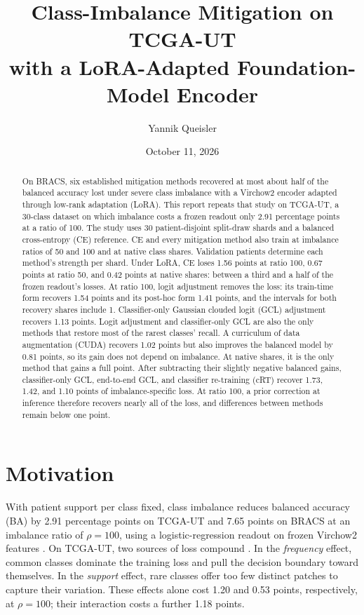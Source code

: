 \documentclass[11pt]{article}
\title{Class-Imbalance Mitigation on TCGA-UT\\with a LoRA-Adapted Foundation-Model Encoder}
\author{Yannik Queisler}
\date{October 11, 2026}
\begin{document}
\raggedbottom
{}
\setlength{\emergencystretch}{2em}
\maketitle
\begin{abstract}
\noindent On BRACS, six established mitigation methods recovered at most about half of the balanced accuracy lost under severe class imbalance with a Virchow2 encoder adapted through low-rank adaptation (LoRA). This report repeats that study on TCGA-UT, a 30-class dataset on which imbalance costs a frozen readout only 2.91 percentage points at a ratio of 100. The study uses 30 patient-disjoint split-draw shards and a balanced cross-entropy (CE) reference. CE and every mitigation method also train at imbalance ratios of 50 and 100 and at native class shares. Validation patients determine each method's strength per shard. Under LoRA, CE loses 1.56 points at ratio 100, 0.67 points at ratio 50, and 0.42 points at native shares: between a third and a half of the frozen readout's losses. At ratio 100, logit adjustment removes the loss: its train-time form recovers 1.54 points and its post-hoc form 1.41 points, and the intervals for both recovery shares include 1. Classifier-only Gaussian clouded logit (GCL) adjustment recovers 1.13 points. Logit adjustment and classifier-only GCL are also the only methods that restore most of the rarest classes' recall. A curriculum of data augmentation (CUDA) recovers 1.02 points but also improves the balanced model by 0.81 points, so its gain does not depend on imbalance. At native shares, it is the only method that gains a full point. After subtracting their slightly negative balanced gains, classifier-only GCL, end-to-end GCL, and classifier re-training (cRT) recover 1.73, 1.42, and 1.10 points of imbalance-specific loss. At ratio 100, a prior correction at inference therefore recovers nearly all of the loss, and differences between methods remain below one point.
\end{abstract}

\section{Motivation}
\label{sec:motivation}
With patient support per class fixed, class imbalance reduces balanced accuracy (BA) by 2.91 percentage points on TCGA-UT and 7.65 points on BRACS at an imbalance ratio of $\rho=100$, using a logistic-regression readout on frozen Virchow2 features \citep{queisler2026prevalenceTcga,queisler2026prevalenceBracs}. On TCGA-UT, two sources of loss compound \citep{queisler2026causeTcga}. In the \emph{frequency} effect, common classes dominate the training loss and pull the decision boundary toward themselves. In the \emph{support} effect, rare classes offer too few distinct patches to capture their variation. These effects alone cost 1.20 and 0.53 points, respectively, at $\rho=100$; their interaction costs a further 1.18 points.
\end{document}
